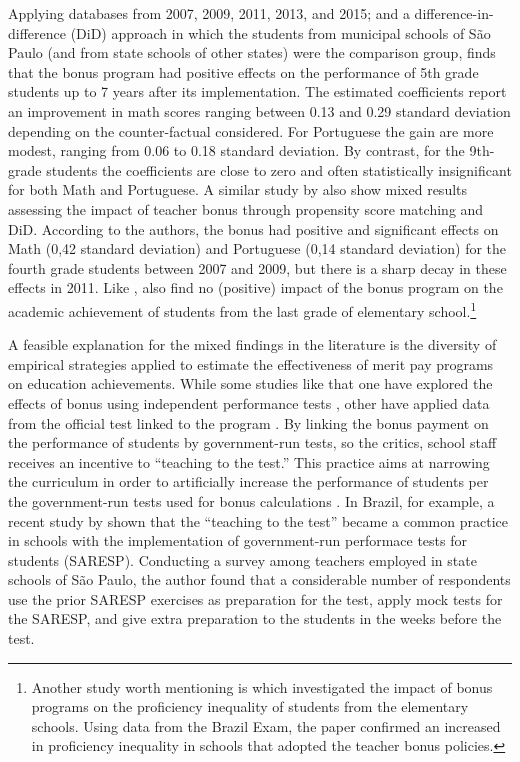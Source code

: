 \documentclass[a4paper, 12pt]{article}
\begin{document}
Applying databases from 2007, 2009, 2011, 2013, and 2015; and a difference-in-difference (DiD) approach in which the students from municipal schools of São Paulo (and from state schools of other states) were the comparison group, \citet{lepine2016teacher} finds that the bonus program had positive effects on the performance of 5th grade students up to 7 years after its implementation. The estimated coefficients report an improvement in math scores ranging between 0.13 and 0.29 standard deviation depending on the counter-factual considered. For Portuguese the gain are more modest, ranging from 0.06 to 0.18 standard deviation. By contrast, for the 9th-grade students the coefficients are close to zero and often statistically insignificant for both Math and Portuguese. A similar study by \citet{oshiro2015impacto} also show mixed results assessing the impact of teacher bonus through propensity score matching and DiD. According to the authors, the bonus had positive and significant effects on Math (0,42 standard deviation) and Portuguese (0,14 standard deviation) for the fourth grade students between 2007 and 2009, but there is a sharp decay in these effects in 2011. Like \citet{lepine2016teacher}, \citet{oshiro2015impacto} also find no (positive) impact of the bonus program on the academic achievement of students from the last grade of elementary school.\footnote{Another study worth mentioning is \citet{scorzafave2016efeito} which investigated the impact of bonus programs on the proficiency inequality of students from the elementary schools. Using data from the Brazil Exam, the paper confirmed an increased in proficiency inequality in schools that adopted the teacher bonus policies.}


A feasible explanation for the mixed findings in the literature is the diversity of empirical strategies applied to estimate the effectiveness of merit pay programs on education achievements. While some studies \textemdash like that one \textemdash have explored the effects of bonus using independent performance tests \citep[see e.g.][]{imberman2015incentive, duflo2012incentives, glewwe2010teacher}, other have applied data from the official test linked to the program \citep[see e.g.][]{barrera2017teacher, britton2016teacher, dee2015incentives, behrman2015aligning}. By linking the bonus payment on the performance of students by government-run tests, so the critics, school staff receives an incentive to “teaching to the test.” This practice aims at narrowing the curriculum in order to artificially increase the performance of students per the government-run tests used for bonus calculations \citep{podgursky2007teacher}. In Brazil, for example, a recent study by \citet{leone2021striving} shown that the “teaching to the test” became a common practice in schools with the implementation of government-run performace tests for students (SARESP). Conducting a survey among teachers employed in state schools of São Paulo, the author found that a considerable number of respondents use the prior SARESP exercises as preparation for the test, apply mock tests for the SARESP, and give extra preparation to the students in the weeks before the test.
\end{document}
